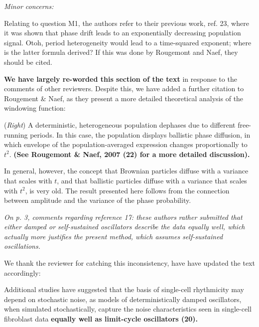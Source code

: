 \documentclass[11pt, letterpaper]{article}
\newenvironment{reviewer}{\itshape\color{gray}}{}
\newenvironment{manuscript}[1]{\begin{center}\begin{tcolorbox}[colback=green!5!white,colframe=green!75!black,width=\textwidth,title={#1},breakable,fonttitle=\bfseries]}{\end{tcolorbox}\end{center}}
\begin{document}
\begin{reviewer}
Minor concerns:

Relating to question M1, the authors refer to their previous work, ref. 23, where it was shown that phase drift leads to an exponentially decreasing population signal. Otoh, period heterogeneity would lead to a time-squared exponent; where is the latter formula derived? If this was done by Rougemont and Naef, they should be cited.
\end{reviewer}

{\bfseries We have largely re-worded this section of the text} in response to the comments of other reviewers. Despite this, we have added a further citation to Rougement \& Naef, as they present a more detailed theoretical analysis of the windowing function:

\begin{manuscript}{Page 16}
   ({\itshape Right}) A deterministic, heterogeneous population dephases due to different free-running periods. In this case, the population displays ballistic phase diffusion, in which envelope of the population-averaged expression changes proportionally to $t^2$. {\bfseries (See Rougemont \& Naef, 2007 (22) for a more detailed discussion).}
\end{manuscript}

In general, however, the concept that Brownian particles diffuse with a variance that scales with $t$, and that ballistic particles diffuse with a variance that scales with $t^2$, is very old. The result presented here follows from the connection between amplitude and the variance of the phase probability.

\begin{reviewer}
On p. 3, comments regarding reference 17: these authors rather submitted that either damped or self-sustained oscillators describe the data equally well, which actually more justifies the present method, which assumes self-sustained oscillations.
\end{reviewer}

We thank the reviewer for catching this inconsistency, have have updated the text accordingly:

\begin{manuscript}{Page 3}
  Additional studies have suggested that the basis of single-cell rhythmicity may depend on stochastic noise, as models of deterministically damped oscillators, when simulated stochastically, capture the noise characteristics seen in single-cell fibroblast data {\bfseries equally well as limit-cycle oscillators (20).}
\end{manuscript}
\end{document}
